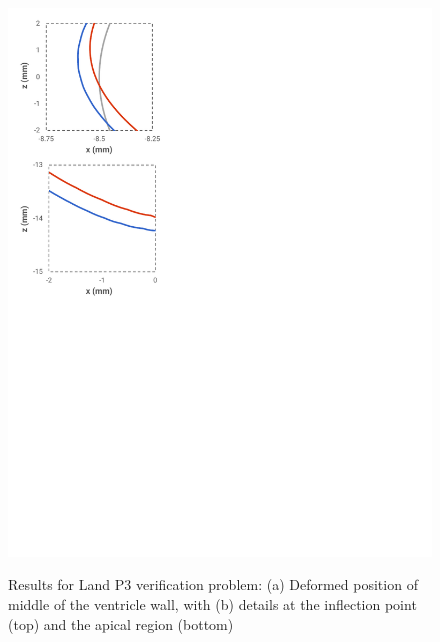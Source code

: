 \begin{figure}[ht!]
{		\includegraphics[scale=0.45]{media/5-verif/6-land3/land3-2.pdf}
\label{fig:land3-2}}	
%
\caption{Results for Land P3 verification problem: (a) Deformed position of middle of the ventricle wall, with (b) details at the inflection point (top) and the apical region (bottom)}
\label{fig:land3}
\end{figure}

